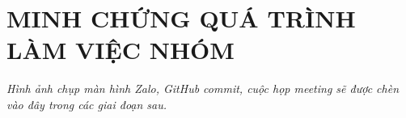 \chapter{MINH CHỨNG QUÁ TRÌNH LÀM VIỆC NHÓM}
\textit{Hình ảnh chụp màn hình Zalo, GitHub commit, cuộc họp meeting sẽ được chèn vào đây trong các giai đoạn sau.}
